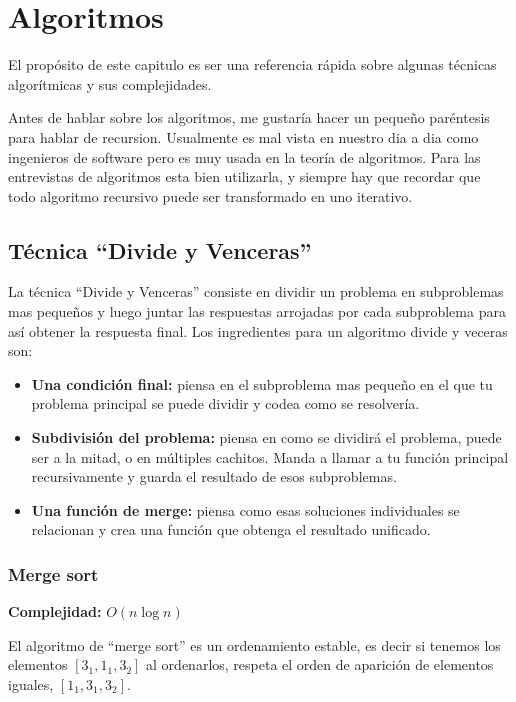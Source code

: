 \chapter{Algoritmos}

El propósito de este capitulo es ser una referencia rápida sobre algunas técnicas algorítmicas y sus complejidades.

Antes de hablar sobre los algoritmos, me gustaría hacer un pequeño paréntesis para hablar de recursion. Usualmente es mal vista en nuestro dia a dia como ingenieros de software pero es muy usada en la teoría de algoritmos. Para las entrevistas de algoritmos esta bien utilizarla, y siempre hay que recordar que todo algoritmo recursivo puede ser transformado en uno iterativo.

\section{Técnica ``Divide y Venceras''}

La técnica ``Divide y Venceras'' consiste en dividir un problema en subproblemas mas pequeños y luego juntar las respuestas arrojadas por cada subproblema para así obtener la respuesta final. Los ingredientes para un algoritmo divide y veceras son:

\begin{itemize}
    \item \textbf{Una condición final:} piensa en el subproblema mas pequeño en el que tu problema principal se puede dividir y codea como se resolvería.
    \item \textbf{Subdivisión del problema:} piensa en como se dividirá el problema, puede ser a la mitad, o en múltiples cachitos. Manda a llamar a tu función principal recursivamente y guarda el resultado de esos subproblemas.
    \item \textbf{Una función de merge:} piensa como esas soluciones individuales se relacionan y crea una función que obtenga el resultado unificado.
\end{itemize}

\subsection{Merge sort}

\textbf{Complejidad:} $O(n \log n)$

El algoritmo de ``merge sort'' es un ordenamiento estable, es decir si tenemos los elementos $[3_1, 1_1,3_2]$ al ordenarlos, respeta el orden de aparición de elementos iguales, $[1_1,3_1,3_2]$.

